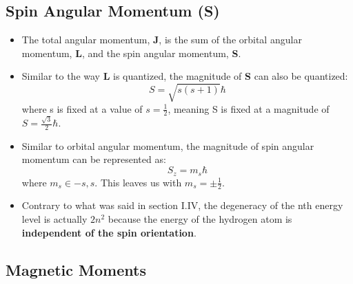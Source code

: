 \documentclass[12pt, letterpaper, twoside]{article}
\begin{document}
\subsection{Spin Angular Momentum (S)}

\begin{itemize}
    \item The total angular momentum, \textbf{J}, is the sum of the orbital angular momentum, \textbf{L}, and the spin angular momentum, \textbf{S}.
    \item Similar to the way \textbf{L} is quantized, the magnitude of \textbf{S} can also be quantized:
    \begin{equation*}
        S = \sqrt{s(s+1)}\hbar
    \end{equation*}
    where s is fixed at a value of $s = \frac{1}{2}$, meaning S is fixed at a magnitude of $S = \frac{\sqrt{3}}{2}\hbar$.
    \item Similar to orbital angular momentum, the magnitude of spin angular momentum can be represented as:
    \begin{equation*}
        S_z = m_s\hbar
    \end{equation*}
    where $m_s \in {-s, s}$. This leaves us with $m_s = \pm \frac{1}{2}$.
    \item Contrary to what was said in section I.IV, the degeneracy of the nth energy level is actually $2n^2$ because the energy of the hydrogen atom is \textbf{independent of the spin orientation}.
\end{itemize}

\subsection{Magnetic Moments}
\end{document}

